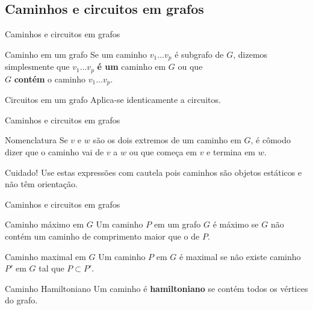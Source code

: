 \documentclass[xcolor=dvipsnames,table]{beamer}
\begin{document}
	\subsection{Caminhos e circuitos em grafos}
	\begin{frame}{Caminhos e circuitos em grafos}
		\begin{block}{Caminho em um grafo}
			Se um caminho $v_1 \ldots v_p$ é subgrafo de $G$, dizemos simplesmente que $v_1 \ldots v_p$ {\bf é um} caminho em $G$ ou que \\$G$ {\bf contém} o caminho $v_1 \ldots v_p$.
		\end{block}  
		\begin{exampleblock}{Circuitos em um grafo}
			Aplica-se identicamente a circuitos.
		\end{exampleblock} 
	\end{frame}
	
	\begin{frame}{Caminhos e circuitos em grafos}
		\begin{block}{Nomenclatura}
			Se $v$ e $w$ são os dois extremos de um caminho em $G$, é cômodo dizer que o caminho vai de $v$ a $w$ ou que começa em $v$ e termina em $w$.
		\end{block}  
		\begin{alertblock}{Cuidado!}
			Use estas expressões com cautela pois caminhos são objetos estáticos e não têm orientação.
		\end{alertblock}
	\end{frame}
	
	\begin{frame}{Caminhos e circuitos em grafos}
		\begin{block}{Caminho máximo em $G$}
			Um caminho $P$ em um grafo $G$ é máximo se $G$ não contém um caminho de comprimento maior que o de $P$.
		\end{block}  
		\begin{block}{Caminho maximal em $G$}
			Um caminho $P$ em $G$ é maximal se não existe caminho $P'$ em $G$ tal que $P \subset P'$.
		\end{block}  
		\begin{block}{Caminho Hamiltoniano}
			Um caminho é {\bf hamiltoniano} se contém todos os vértices do grafo.
		\end{block}
	\end{frame}	
\end{document}
